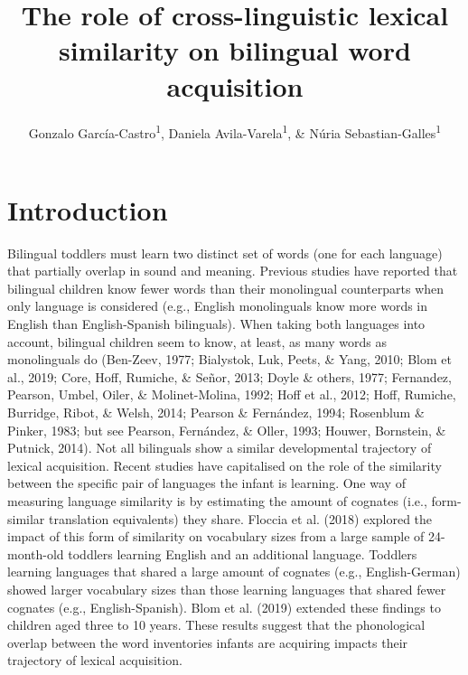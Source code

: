 \documentclass[
  english,
  man,man,floatsintext]{apa6}
\title{The role of cross-linguistic lexical similarity on bilingual word acquisition}
\author{Gonzalo García-Castro\textsuperscript{1}, Daniela Avila-Varela\textsuperscript{1}, \& Núria Sebastian-Galles\textsuperscript{1}}
\date{}
\affiliation{\vspace{0.5cm}\textsuperscript{1} Center for Brain and Cognition, Universitat Pompeu Fabra, Barcelona, Spain}
\begin{document}
\maketitle

\hypertarget{introduction}{%
\section{Introduction}\label{introduction}}

Bilingual toddlers must learn two distinct set of words (one for each language) that partially overlap in sound and meaning. Previous studies have reported that bilingual children know fewer words than their monolingual counterparts when only language is considered (e.g., English monolinguals know more words in English than English-Spanish bilinguals). When taking both languages into account, bilingual children seem to know, at least, as many words as monolinguals do (Ben-Zeev, 1977; Bialystok, Luk, Peets, \& Yang, 2010; Blom et al., 2019; Core, Hoff, Rumiche, \& Señor, 2013; Doyle \& others, 1977; Fernandez, Pearson, Umbel, Oiler, \& Molinet-Molina, 1992; Hoff et al., 2012; Hoff, Rumiche, Burridge, Ribot, \& Welsh, 2014; Pearson \& Fernández, 1994; Rosenblum \& Pinker, 1983; but see Pearson, Fernández, \& Oller, 1993; Houwer, Bornstein, \& Putnick, 2014). Not all bilinguals show a similar developmental trajectory of lexical acquisition. Recent studies have capitalised on the role of the similarity between the specific pair of languages the infant is learning. One way of measuring language similarity is by estimating the amount of cognates (i.e., form-similar translation equivalents) they share. Floccia et al. (2018) explored the impact of this form of similarity on vocabulary sizes from a large sample of 24-month-old toddlers learning English and an additional language. Toddlers learning languages that shared a large amount of cognates (e.g., English-German) showed larger vocabulary sizes than those learning languages that shared fewer cognates (e.g., English-Spanish). Blom et al. (2019) extended these findings to children aged three to 10 years. These results suggest that the phonological overlap between the word inventories infants are acquiring impacts their trajectory of lexical acquisition.
\end{document}
